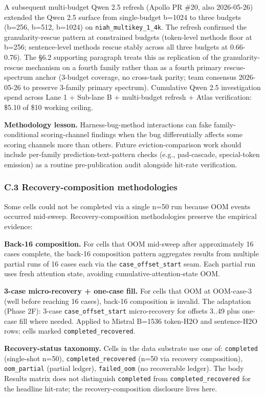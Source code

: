 \documentclass[
]{article}
\begin{document}
A subsequent multi-budget Qwen 2.5 refresh (Apollo PR \#20, also
2026-05-26) extended the Qwen 2.5 surface from single-budget b=1024
to three budgets (b=256, b=512, b=1024) on \texttt{niah\_multikey\_1\_4k}.
The refresh confirmed the granularity-rescue pattern at constrained
budgets (token-level methods floor at b=256; sentence-level methods
rescue stably across all three budgets at 0.66-0.76). The §6.2
supporting paragraph treats this as replication of the
granularity-rescue mechanism on a fourth family rather than as a
fourth primary rescue-spectrum anchor (3-budget coverage, no
cross-task parity; team consensus 2026-05-26 to preserve 3-family
primary spectrum). Cumulative Qwen 2.5 investigation spend across
Lane 1 + Sub-lane B + multi-budget refresh + Atlas verification:
\$5.10 of \$10 working ceiling.

\textbf{Methodology lesson.} Harness-bug-method interactions can fake
family-conditional scoring-channel findings when the bug
differentially affects some scoring channels more than others. Future
eviction-comparison work should include per-family
prediction-text-pattern checks (e.g., pad-cascade, special-token
emission) as a routine pre-publication audit alongside hit-rate
verification.

\subsubsection{C.3 Recovery-composition methodologies}\label{c-3-recovery-composition-methodologies}

Some cells could not be completed via a single n=50 run because OOM
events occurred mid-sweep. Recovery-composition methodologies preserve
the empirical evidence:

\textbf{Back-16 composition.} For cells that OOM mid-sweep after
approximately 16 cases complete, the back-16 composition pattern
aggregates results from multiple partial runs of 16 cases each via the
\texttt{case\_offset\_start} seam. Each partial run uses fresh attention
state, avoiding cumulative-attention-state OOM.

\textbf{3-case micro-recovery + one-case fill.} For cells that OOM at
OOM-case-3 (well before reaching 16 cases), back-16 composition is
invalid. The adaptation (Phase 2F): 3-case
\texttt{case\_offset\_start} micro-recovery for offsets 3..49 plus
one-case fill where needed. Applied to Mistral B=1536 token-H2O and
sentence-H2O rows; cells marked \texttt{completed\_recovered}.

\textbf{Recovery-status taxonomy.} Cells in the data substrate use one
of: \texttt{completed} (single-shot n=50), \texttt{completed\_recovered}
(n=50 via recovery composition), \texttt{oom\_partial} (partial ledger),
\texttt{failed\_oom} (no recoverable ledger). The body Results matrix
does not distinguish \texttt{completed} from \texttt{completed\_recovered}
for the headline hit-rate; the recovery-composition disclosure lives
here.
\end{document}
